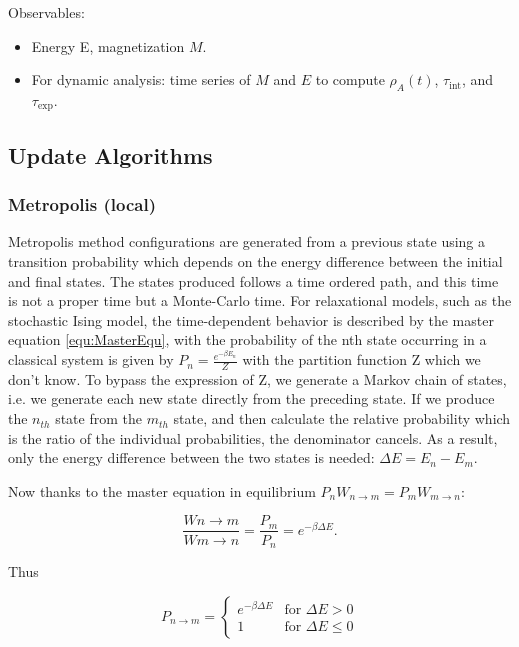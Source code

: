 Observables:
\begin{itemize}
    \item Energy E, magnetization $M$.
    \item For dynamic analysis: time series of $M$ and $E$ to compute $\rho_A(t)$, $\tau_{\text{int}}$, and $\tau_{\text{exp}}$.
\end{itemize}


\subsection{Update Algorithms}
\subsubsection{Metropolis (local)}
Metropolis method \cite{Metropolis} configurations are
generated from a previous state using a transition probability which depends
on the energy difference between the initial and final states. The states produced follows a time ordered path, and this time is not a proper time but a Monte-Carlo time. 
For relaxational models, such as the stochastic Ising model, the time-dependent behavior is described by the master equation \ref{equ:MasterEqu}, with the probability of the nth state occurring in a classical system is given by
$P_n = \frac{e^{-\beta E_n}}{Z}$ with the partition function Z which we don't know. To bypass the expression of Z, we generate a Markov chain of states, i.e. we generate each new state directly from the preceding state. If we produce the $n_{th}$ state from the $m_{th}$ state, and then calculate the
relative probability which is the ratio of the individual probabilities, the denominator cancels. As a result, only the energy difference between the two states is needed: $\Delta E = E_n - E_m$.

Now thanks to the master equation in equilibrium 
$P_n W_{n\to m} = P_m W_{m\to n }$:

\begin{equation}
    \frac{Wn\to m}{Wm\to n} = \frac{P_m}{P_n} = e^{-\beta \Delta E}.
\end{equation}

Thus

\begin{equation}
P_{n\to m} =
\begin{cases}
e^{-\beta \Delta E} & \text{for } \Delta E > 0 \\
1 & \text{for } \Delta E \le 0
\end{cases}
\end{equation}

